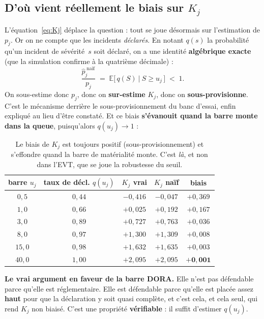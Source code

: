 \documentclass[11pt,a4paper]{article}
\begin{document}
\subsection*{D'où vient réellement le biais sur $K_j$}

L'équation~\eqref{eq:Kj} déplace la question : tout se joue désormais sur l'estimation de
$p_j$. Or on ne compte que les incidents \emph{déclarés}. En notant $q(s)$ la probabilité
qu'un incident de sévérité~$s$ soit déclaré, on a une identité \textbf{algébrique exacte}
(que la simulation confirme à la quatrième décimale) :
\begin{equation}
\frac{\hat p_j^{\;\text{naïf}}}{p_j} \;=\; \mathbb E\big[\,q(S)\ \big|\ S \ge u_j\,\big]
\;<\; 1 .
\end{equation}
On sous-estime donc $p_j$, donc on \textbf{sur-estime} $K_j$, donc on
\textbf{sous-provisionne}. C'est le mécanisme derrière le sous-provisionnement du banc
d'essai, enfin expliqué au lieu d'être constaté. Et ce biais \textbf{s'évanouit quand la
barre monte dans la queue}, puisqu'alors $q(u_j) \to 1$ :

\begin{table}[htbp]\centering\small
\renewcommand{\arraystretch}{1.2}
\begin{tabular}{@{}c c c c c@{}}
\toprule
\textbf{barre $u_j$} & \textbf{taux de décl. $q(u_j)$} & \textbf{$K_j$ vrai} & \textbf{$K_j$ naïf} & \textbf{biais} \\
\midrule
$0{,}5$ & $0{,}44$ & $-0{,}416$ & $-0{,}047$ & $+0{,}369$ \\
$1{,}0$ & $0{,}66$ & $+0{,}025$ & $+0{,}192$ & $+0{,}167$ \\
$3{,}0$ & $0{,}89$ & $+0{,}727$ & $+0{,}763$ & $+0{,}036$ \\
$8{,}0$ & $0{,}97$ & $+1{,}300$ & $+1{,}309$ & $+0{,}008$ \\
$15{,}0$ & $0{,}98$ & $+1{,}632$ & $+1{,}635$ & $+0{,}003$ \\
$40{,}0$ & $1{,}00$ & $+2{,}095$ & $+2{,}095$ & $\mathbf{+0{,}001}$ \\
\bottomrule
\end{tabular}
\caption{Le biais de $K_j$ est toujours positif (sous-provisionnement) et s'effondre quand
la barre de matérialité monte. C'est \emph{là}, et non dans l'EVT, que se joue la robustesse
du seuil.}
\end{table}

\begin{cle}
\textbf{Le vrai argument en faveur de la barre DORA.} Elle n'est pas défendable parce
qu'elle est \og{}réglementaire\fg{}. Elle est défendable parce qu'elle est placée assez
\textbf{haut} pour que la déclaration y soit quasi complète, et c'est cela, et cela seul, qui
rend $K_j$ non biaisé. C'est une propriété \textbf{vérifiable} : il suffit d'estimer
$q(u_j)$.
\end{cle}
\end{document}
